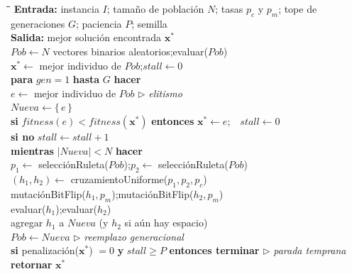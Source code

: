 \documentclass[letter, 10pt]{article}
\begin{document}
\begin{algorithm}[ht]
\caption{Algoritmo genético para el EVCSPP}
\label{alg:ga}
\begin{tabbing}
\hspace{1.6em}\=\hspace{1.6em}\=\hspace{1.6em}\=\kill
\textbf{Entrada:} instancia $I$; tamaño de población $N$; tasas $p_c$ y $p_m$; tope de generaciones $G$; paciencia $P$; semilla \\
\textbf{Salida:} mejor solución encontrada $\mathbf{x}^*$ \\[3pt]
$\mathit{Pob} \gets N$ vectores binarios aleatorios;\quad evaluar($\mathit{Pob}$) \\
$\mathbf{x}^* \gets$ mejor individuo de $\mathit{Pob}$;\quad $\mathit{stall} \gets 0$ \\
\textbf{para} $gen = 1$ \textbf{hasta} $G$ \textbf{hacer} \\
\> $e \gets$ mejor individuo de $\mathit{Pob}$ \quad $\triangleright$ \textit{elitismo} \\
\> $\mathit{Nueva} \gets \{\, e \,\}$ \\
\> \textbf{si} $\mathit{fitness}(e) < \mathit{fitness}(\mathbf{x}^*)$ \textbf{entonces} $\mathbf{x}^* \gets e$;\ \ $\mathit{stall} \gets 0$ \\
\> \textbf{si no} $\mathit{stall} \gets \mathit{stall} + 1$ \\
\> \textbf{mientras} $|\mathit{Nueva}| < N$ \textbf{hacer} \\
\>\> $p_1 \gets$ selecciónRuleta($\mathit{Pob}$);\quad $p_2 \gets$ selecciónRuleta($\mathit{Pob}$) \\
\>\> $(h_1, h_2) \gets$ cruzamientoUniforme($p_1, p_2, p_c$) \\
\>\> mutaciónBitFlip($h_1, p_m$);\quad mutaciónBitFlip($h_2, p_m$) \\
\>\> evaluar($h_1$);\quad evaluar($h_2$) \\
\>\> agregar $h_1$ a $\mathit{Nueva}$ (y $h_2$ si aún hay espacio) \\
\> $\mathit{Pob} \gets \mathit{Nueva}$ \quad $\triangleright$ \textit{reemplazo generacional} \\
\> \textbf{si} penalización($\mathbf{x}^*$) $= 0$ \textbf{y} $\mathit{stall} \geq P$ \textbf{entonces terminar} \quad $\triangleright$ \textit{parada temprana} \\
\textbf{retornar} $\mathbf{x}^*$
\end{tabbing}
\end{algorithm}
\end{document}
